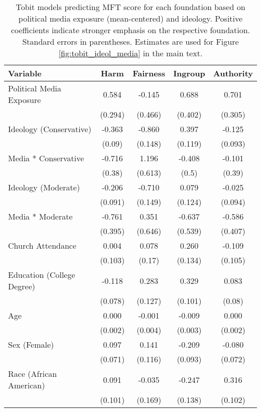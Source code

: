 \begin{table}[ht]
\centering
\caption{Tobit models predicting MFT score for each foundation based 
           on political media exposure (mean-centered) and ideology. Positive coefficients indicate 
           stronger emphasis on the respective foundation. Standard errors in parentheses. Estimates 
           are used for Figure \ref{fig:tobit_ideol_media} in the main text.} 
\label{tab:tobit_ideol_media}
\begingroup\footnotesize
\begin{tabular}{lcccc}
  \hline
Variable & Harm & Fairness & Ingroup & Authority \\ 
  \hline
Political Media Exposure &  0.584 & -0.145 &  0.688 &  0.701 \\ 
   & (0.294) & (0.466) & (0.402) & (0.305) \\ 
  Ideology (Conservative) & -0.363 & -0.860 &  0.397 & -0.125 \\ 
   & (0.09) & (0.148) & (0.119) & (0.093) \\ 
  Media * Conservative & -0.716 &  1.196 & -0.408 & -0.101 \\ 
   & (0.38) & (0.613) & (0.5) & (0.39) \\ 
  Ideology (Moderate) & -0.206 & -0.710 &  0.079 & -0.025 \\ 
   & (0.091) & (0.149) & (0.124) & (0.094) \\ 
  Media * Moderate & -0.761 &  0.351 & -0.637 & -0.586 \\ 
   & (0.395) & (0.646) & (0.539) & (0.407) \\ 
  Church Attendance &  0.004 &  0.078 &  0.260 & -0.109 \\ 
   & (0.103) & (0.17) & (0.134) & (0.105) \\ 
  Education (College Degree) & -0.118 &  0.283 &  0.329 &  0.083 \\ 
   & (0.078) & (0.127) & (0.101) & (0.08) \\ 
  Age &  0.000 & -0.001 & -0.009 &  0.000 \\ 
   & (0.002) & (0.004) & (0.003) & (0.002) \\ 
  Sex (Female) &  0.097 &  0.141 & -0.209 & -0.080 \\ 
   & (0.071) & (0.116) & (0.093) & (0.072) \\ 
  Race (African American) &  0.091 & -0.035 & -0.247 &  0.316 \\ 
   & (0.101) & (0.169) & (0.138) & (0.102) \\ 

\end{tabular}
\end{table}

